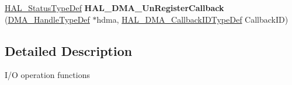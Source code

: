 \begin{DoxyCompactItemize}
\item 
\mbox{\label{group___d_m_a___exported___functions___group2_ga87842d3780f0e54c7fb29a003e6b5ac4}} 
\mbox{\hyperlink{stm32f4xx__hal__def_8h_a63c0679d1cb8b8c684fbb0632743478f}{H\+A\+L\+\_\+\+Status\+Type\+Def}} {\bfseries H\+A\+L\+\_\+\+D\+M\+A\+\_\+\+Un\+Register\+Callback} (\mbox{\hyperlink{group___d_m_a___exported___types_ga41b754a906b86bce54dc79938970138b}{D\+M\+A\+\_\+\+Handle\+Type\+Def}} $\ast$hdma, \mbox{\hyperlink{group___d_m_a___exported___types_gafbe8b2bd9ce2128de6cdc08ccde7e8ad}{H\+A\+L\+\_\+\+D\+M\+A\+\_\+\+Callback\+I\+D\+Type\+Def}} Callback\+ID)
\end{DoxyCompactItemize}


\subsection{Detailed Description}
I/O operation functions ~\newline
 


